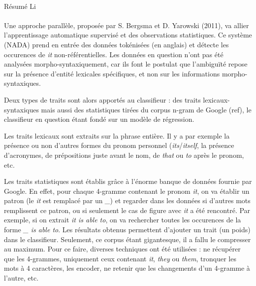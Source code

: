 \documentclass[a4paper,12pt]{article}
\begin{document}
\paragraph{}
Résumé Li

\paragraph{}
Une approche parallèle, proposée par S. Bergsma et D. Yarowski (2011), va allier l'apprentissage automatique supervisé et des observations statistiques.
Ce système (NADA) prend en entrée des données tokénisées (en anglais) et détecte les occurences de \og{}\textit{it}\fg{} non-référentielles. Les données en question n'ont pas été analysées morpho-syntaxiquement, car ils font le postulat que l'ambiguïté repose sur la présence d'entité lexicales spécifiques, et non sur les informations morpho-syntaxiques.

Deux types de traits sont alors apportés au classifieur : des traits lexicaux-syntaxiques mais aussi des statistiques tirées du corpus n-gram de Google (ref), le classifieur en question étant fondé sur un modèle de régression.

Les traits lexicaux sont extraits sur la phrase entière. Il y a par exemple la présence ou non d'autres formes du pronom personnel (\textit{its}/\textit{itself}, la présence d'acronymes, de prépositions juste avant le nom, de \og{}\textit{that}\fg{} ou \og{}\textit{to}\fg{} après le pronom, etc.

Les traits statistiques sont établis grâce à l'énorme banque de données fournie par Google. En effet, pour chaque 4-gramme contenant le pronom \og{}\textit{it}\fg{}, on va établir un patron (le \og{}\textit{it}\fg{} est remplacé par un \og{}\textit{\_}\fg{}) et regarder dans les données si d'autres mots remplissent ce patron, ou si seulement le cas de figure avec \og{}\textit{it}\fg{} a été rencontré. Par exemple, si on extrait \og{}\textit{it is able to}\fg{}, on va rechercher toutes les occurences de la forme \og{}\textit{\_ is able to}\fg{}.
Les résultats obtenus permettent d'ajouter un trait (un poids) dans le classifieur.
Seulement, ce corpus étant gigantesque, il a fallu le compresser au maximum. Pour ce faire, diverses techniques ont été utilisées : ne récupérer que les 4-grammes, uniquement ceux contenant \og{}\textit{it}\fg{}, \og{}\textit{they}\fg{} ou \og{}\textit{them}\fg{}, tronquer les mots à 4 caractères, les encoder, ne retenir que les changements d'un 4-gramme à l'autre, etc.
\end{document}
